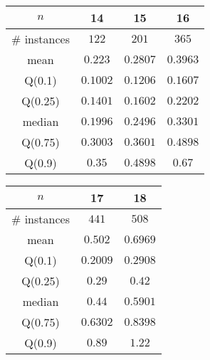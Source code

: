 \begin{tabular}{c|ccc} 
\hline 
$n$ & 14 & 15 & 16 \tabularnewline 
\hline 
\hline 
\# instances & $122$ & $201$ & $365$ \tabularnewline 
mean & $0.223$ & $0.2807$ & $0.3963$ \tabularnewline 
Q(0.1) & $0.1002$ & $0.1206$ & $0.1607$ \tabularnewline 
Q(0.25) & $0.1401$ & $0.1602$ & $0.2202$ \tabularnewline 
median & $0.1996$ & $0.2496$ & $0.3301$ \tabularnewline 
Q(0.75) & $0.3003$ & $0.3601$ & $0.4898$ \tabularnewline 
Q(0.9) & $0.35$ & $0.4898$ & $0.67$ \tabularnewline 
\hline 
\end{tabular} 
\medskip{} 

\begin{tabular}{c|cc} 
\hline 
$n$ & 17 & 18 \tabularnewline 
\hline 
\hline 
\# instances & $441$ & $508$ \tabularnewline 
mean & $0.502$ & $0.6969$ \tabularnewline 
Q(0.1) & $0.2009$ & $0.2908$ \tabularnewline 
Q(0.25) & $0.29$ & $0.42$ \tabularnewline 
median & $0.44$ & $0.5901$ \tabularnewline 
Q(0.75) & $0.6302$ & $0.8398$ \tabularnewline 
Q(0.9) & $0.89$ & $1.22$ \tabularnewline 
\hline 
\end{tabular} 
\medskip{} 

